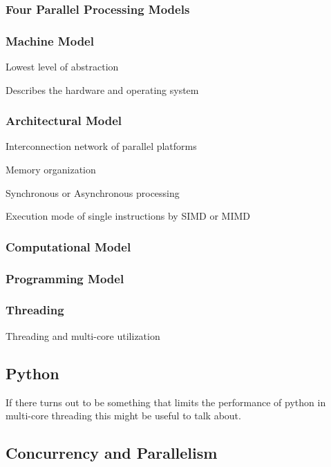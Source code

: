 \documentclass{article}
\begin{document}
\subsubsection{Four Parallel Processing Models}

\subsubsection{Machine Model}

Lowest level of abstraction

Describes the hardware and operating system

\subsubsection{Architectural Model}

Interconnection network of parallel platforms

Memory organization

Synchronous or Asynchronous processing

Execution mode of single instructions by SIMD or MIMD

\subsubsection{Computational Model}

\subsubsection{Programming Model}

\subsubsection{Threading}

Threading and multi-core utilization 

\subsection{Python}

If there turns out to be something that limits the performance of python in multi-core threading this might be useful to talk about.

\subsection{Concurrency and Parallelism}
\end{document}
